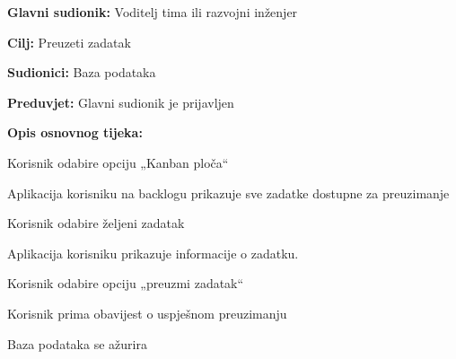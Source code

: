 							\noindent {}
							\begin{packed_item}
		
								\item \textbf{Glavni sudionik:} Voditelj tima ili razvojni inženjer
								\item  \textbf{Cilj:} Preuzeti zadatak
								\item  \textbf{Sudionici:} Baza podataka
								\item  \textbf{Preduvjet:}  Glavni sudionik je prijavljen
								\item  \textbf{Opis osnovnog tijeka:}
		
								\item[] \begin{packed_enum}
   									\item Korisnik odabire opciju „Kanban ploča“
									\item Aplikacija korisniku na backlogu prikazuje sve zadatke dostupne za preuzimanje
									\item Korisnik odabire željeni zadatak
									\item Aplikacija korisniku prikazuje informacije o zadatku.
									\item Korisnik odabire opciju „preuzmi zadatak“
									\item Korisnik prima obavijest o uspješnom preuzimanju
									\item Baza podataka se ažurira
                                		\end{packed_enum}
		
							\end{packed_item}


